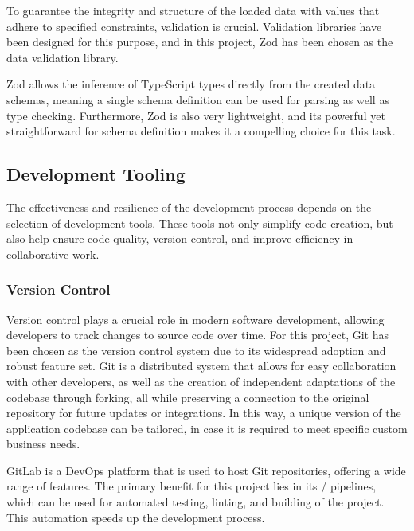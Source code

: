 To guarantee the integrity and structure of the loaded data with values that adhere to specified constraints, validation is crucial. Validation libraries have been designed for this purpose, and in this project, Zod has been chosen as the data validation library.

Zod allows the inference of TypeScript types directly from the created data schemas, meaning a single schema definition can be used for parsing as well as type checking. Furthermore, Zod is also very lightweight, and its powerful yet straightforward  for schema definition makes it a compelling choice for this task.~\cite{Bhimani2023}


\subsection{Development Tooling}

The effectiveness and resilience of the development process depends on the selection of development tools. These tools not only simplify code creation, but also help ensure code quality, version control, and improve efficiency in collaborative work.

\subsubsection{Version Control}

Version control plays a crucial role in modern software development, allowing developers to track changes to source code over time. For this project, Git has been chosen as the version control system due to its widespread adoption and robust feature set. Git is a distributed system that allows for easy collaboration with other developers, as well as the creation of independent adaptations of the codebase through forking, all while preserving a connection to the original repository for future updates or integrations. In this way, a unique version of the application codebase can be tailored, in case it is required to meet specific custom business needs.~\cite{Ponuthorai2022}

GitLab is a DevOps platform that is used to host Git repositories, offering a wide range of features. The primary benefit for this project lies in its / pipelines, which can be used for automated testing, linting, and building of the project. This automation speeds up the development process.~\cite{GitLab}


